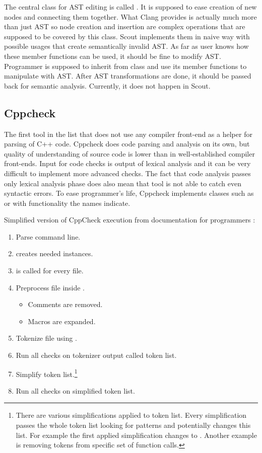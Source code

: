 The central class for AST editing is called . It is supposed to ease creation of new nodes and connecting them together. What Clang provides is actually much more than just AST so node creation and insertion are complex operations that are supposed to be covered by this class. Scout implements them in naive way with possible usages that create semantically invalid AST. As far as user knows how these member functions can be used, it should be fine to modify AST. Programmer is supposed to inherit from  class and use its member functions to manipulate with AST. After AST transformations are done, it should be passed back for semantic analysis. Currently, it does not happen in Scout.

\subsection{Cppcheck}
The first tool in the list that does not use any compiler front-end as a helper for parsing of C++ code. Cppcheck does code parsing and analysis on its own, but quality of understanding of source code is lower than in well-established compiler front-ends. Input for code checks is output of lexical analysis and it can be very difficult to implement more advanced checks. The fact that code analysis passes only lexical analysis phase does also mean that tool is not able to catch even syntactic errors. To ease programmer's life, Cppcheck implements classes such as  or  with functionality the names indicate.

Simplified version of CppCheck execution from documentation for programmers \cite{cppcheck-doxygen}:

\begin{enumerate}
\item Parse command line.
\item {} creates needed  instances.
\item {} is called for every file.
\item Preprocess file inside .
    \begin{itemize}
    \item Comments are removed.
    \item Macros are expanded.
    \end{itemize}
\item Tokenize file using .
\item Run all checks on tokenizer output called token list.
\item Simplify token list.\footnote{There are various simplifications applied to token list. Every simplification passes the whole token list looking for patterns and potentially changes this list. For example the first applied simplification changes  to . Another example is removing  tokens from specific set of function calls.}
\item Run all checks on simplified token list.
\end{enumerate}
